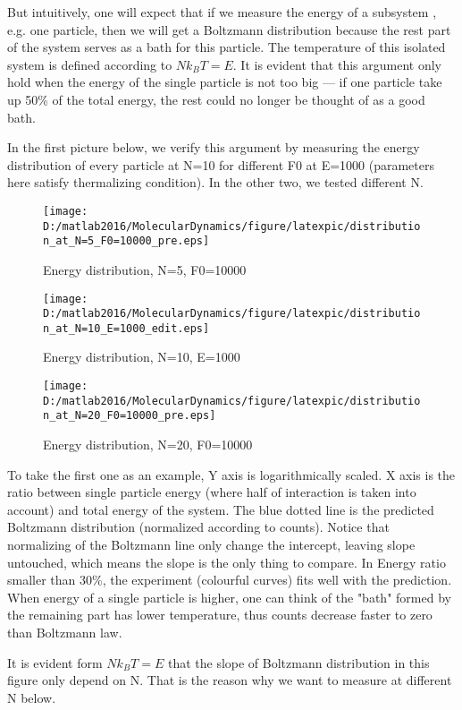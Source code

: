\documentclass[aps,pre,twocolumn
,groupedaddress]{revtex4-1}
\begin{document}
But intuitively, one will expect that if we measure the energy of a subsystem , e.g. one particle, then we will get a Boltzmann distribution because the rest part of the system serves as a bath for this particle. The temperature of this isolated system is defined according to $Nk_BT=E$. It is evident that this argument only hold when the energy of the single particle is not too big --- if one particle take up 50\% of the total energy, the rest could no longer be thought of as a good bath.

In the first picture below, we verify this argument by measuring the energy distribution of every particle at N=10 for different F0 at E=1000 (parameters here satisfy thermalizing condition). In the other two, we tested different N.

\newpage
\begin{figure}[hbtp]
\centering
\texttt{[image: D:/matlab2016/MolecularDynamics/figure/latexpic/distribution\_at\_N=5\_F0=10000\_pre.eps]}
\caption{Energy distribution, N=5, F0=10000}
\label{fig:thermalization8}

\texttt{[image: D:/matlab2016/MolecularDynamics/figure/latexpic/distribution\_at\_N=10\_E=1000\_edit.eps]}
\caption{Energy distribution, N=10, E=1000 {\color{red}{Run with N=10 F0=10000 to substitute this one}} }
\label{fig:thermalization9}

\texttt{[image: D:/matlab2016/MolecularDynamics/figure/latexpic/distribution\_at\_N=20\_F0=10000\_pre.eps]} 
\caption{Energy distribution, N=20, F0=10000}
\label{fig:thermalization10}
\end{figure}

\newpage

To take the first one as an example, Y axis is logarithmically scaled. X axis is the ratio between single particle energy (where half of interaction is taken into account) and total energy of the system. The blue dotted line is the predicted Boltzmann distribution (normalized according to counts). Notice that normalizing of the Boltzmann line only change the intercept, leaving slope untouched, which means the slope is the only thing to compare. In  Energy ratio smaller than 30\%, the experiment (colourful curves) fits well with the prediction. When energy of a single particle is higher, one can think of the "bath" formed by the remaining part has lower temperature, thus counts decrease faster to zero than Boltzmann law.

It is evident form $Nk_BT=E$ that the slope of Boltzmann distribution in this figure only depend on N. That is the reason why we want to measure at different N below. 
\end{document}

